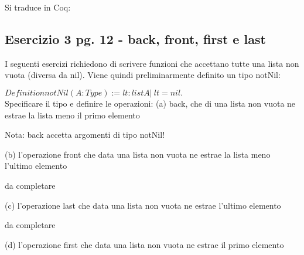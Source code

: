 Si traduce in Coq:



\subsection{Esercizio 3 pg. 12 - back, front, first e last}

I seguenti esercizi richiedono di scrivere funzioni che accettano tutte una
lista non vuota (diversa da nil). Viene quindi preliminarmente definito un tipo
notNil:

$Definition notNil (A : Type) := { lt : list A | ~ lt = nil }.$ \\

Specificare il tipo e definire le operazioni:
(a) back, che di una lista non vuota ne estrae la lista meno il primo elemento



Nota: back accetta argomenti di tipo notNil!

(b) l'operazione front che data una lista non vuota ne estrae la lista meno
l'ultimo elemento



da completare

(c) l'operazione last che data una lista non vuota ne estrae l'ultimo elemento



da completare

(d) l'operazione first che data una lista non vuota ne estrae il primo
elemento


